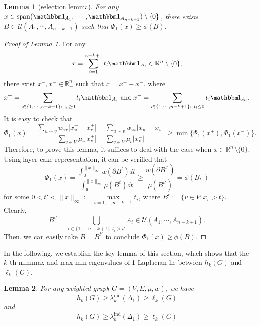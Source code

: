 \documentclass[12pt, reqno]{article}
\newtheorem{lemma}{Lemma}
\newcommand{\R}{\mathbb{R}}
\begin{document}
\begin{lemma}[selection lemma]\label{lem:levelset}
For any $x\in \mathrm{span}(\mathbbm 1_{A_1},\cdots,\mathbbm 1_{A_{n-k+1}})\setminus\{0\}$, there exists $B\in \mathcal{U}(A_1,\cdots,A_{n-k+1})$ such that $\Phi_1(x)\ge\phi(B)$. 
\end{lemma}
\begin{proof}[Proof of Lemma \ref{lem:levelset}]
For any \[x=\sum\limits_{i=1}^{n-k+1}t_i\mathbbm 1_{A_i}\in\R^n\setminus\{0\},\] there exist $ x^+, x^-\in \R^n_+$ such that $ x= x^+- x^-$, where \[x^+=\sum\limits_{i\in\{1,\cdots,n-k+1\}:~t_i\ge 0}t_i\mathbbm 1_{A_i}\text{ and }x^-=\sum\limits_{i\in\{1,\cdots,n-k+1\}:~t_i\le 0}t_i\mathbbm 1_{A_i}.\] It is easy to check that 
\begin{equation}\label{eq:F_1x+x-}
 \Phi_1( x)=\frac{\sum\limits_{u\sim v}w_{uv}|x_u^+-x_v^+|+\sum\limits_{u\sim v}w_{uv}|x_u^--x_v^-|}{\sum\limits_{v\in V}\mu_v|x_v^+|+\sum\limits_{v\in V}\mu_v|x_v^-|}\ge\min\{\Phi_1( x^+),\Phi_1( x^-)\}.   
\end{equation} 
Therefore, to prove this lemma, it suffices to deal with the case when $ x\in \R^n_+\setminus\{0\}$. Using layer cake representation, it can be verified that
\[\Phi_1( x)=\frac{\int_0^{\| x\|_\infty}w(\partial B^t)dt}{\int_0^{\| x\|_\infty}\mu(B^t)dt}\ge \frac{w(\partial B^{t'})}{\mu(B^{t'})}=\phi(B_{t'})\]
for some $0<t'<\| x\|_\infty:=\max\limits_{i=1,\cdots,n-k+1}t_i$, 
where $B^t%
:=\{v\in V:x_v>t\}$. Clearly, 
$$B^{t'}=\bigcup_{i\in\{1,\cdots,n-k+1\}:t_i>t'}A_i\in \mathcal{U}(A_1,\cdots,A_{n-k+1}).$$
Then, we can easily take $B=B^{t'}$ to conclude $\Phi_1( x)\ge\phi(B)$.
\end{proof}
In the following, we establish the key lemma of this section, which shows that the $k$-th minimax and max-min eigenvalues of 1-Laplacian lie between $h_k(G)$ and $\ell_k(G)$. 
\begin{lemma}\label{lem:general-graph-delta}
For any weighted graph $G=(V,E,\mu,w)$, we have
\begin{equation}\label{eq:hk>lambdak>lk}
h_k(G)\ge \lambda_k^{\mathrm{ind}}(\Delta_1)\ge \ell_k(G)
\end{equation}
and \begin{equation}\label{eq:hk>lambdak2>lk}
h_k(G)\ge \underline{\lambda_k^{\mathrm{ind}}}(\Delta_1)\ge \ell_k(G) \end{equation}
\end{lemma}
\end{document}
